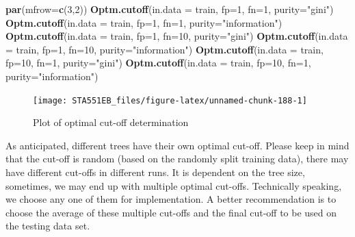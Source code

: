 \documentclass[
]{book}
\newenvironment{Shaded}{\begin{snugshade}}{\end{snugshade}}
\newcommand{\AttributeTok}[1]{\textcolor[rgb]{0.13,0.29,0.53}{#1}}
\newcommand{\DecValTok}[1]{\textcolor[rgb]{0.00,0.00,0.81}{#1}}
\newcommand{\FunctionTok}[1]{\textcolor[rgb]{0.13,0.29,0.53}{\textbf{#1}}}
\newcommand{\NormalTok}[1]{#1}
\newcommand{\StringTok}[1]{\textcolor[rgb]{0.31,0.60,0.02}{#1}}
\begin{document}
\begin{Shaded}
\begin{Highlighting}[]
\FunctionTok{par}\NormalTok{(}\AttributeTok{mfrow=}\FunctionTok{c}\NormalTok{(}\DecValTok{3}\NormalTok{,}\DecValTok{2}\NormalTok{))}
\FunctionTok{Optm.cutoff}\NormalTok{(}\AttributeTok{in.data =}\NormalTok{ train, }\AttributeTok{fp=}\DecValTok{1}\NormalTok{, }\AttributeTok{fn=}\DecValTok{1}\NormalTok{, }\AttributeTok{purity=}\StringTok{"gini"}\NormalTok{)}
\FunctionTok{Optm.cutoff}\NormalTok{(}\AttributeTok{in.data =}\NormalTok{ train, }\AttributeTok{fp=}\DecValTok{1}\NormalTok{, }\AttributeTok{fn=}\DecValTok{1}\NormalTok{, }\AttributeTok{purity=}\StringTok{"information"}\NormalTok{)}
\FunctionTok{Optm.cutoff}\NormalTok{(}\AttributeTok{in.data =}\NormalTok{ train, }\AttributeTok{fp=}\DecValTok{1}\NormalTok{, }\AttributeTok{fn=}\DecValTok{10}\NormalTok{, }\AttributeTok{purity=}\StringTok{"gini"}\NormalTok{)}
\FunctionTok{Optm.cutoff}\NormalTok{(}\AttributeTok{in.data =}\NormalTok{ train, }\AttributeTok{fp=}\DecValTok{1}\NormalTok{, }\AttributeTok{fn=}\DecValTok{10}\NormalTok{, }\AttributeTok{purity=}\StringTok{"information"}\NormalTok{)}
\FunctionTok{Optm.cutoff}\NormalTok{(}\AttributeTok{in.data =}\NormalTok{ train, }\AttributeTok{fp=}\DecValTok{10}\NormalTok{, }\AttributeTok{fn=}\DecValTok{1}\NormalTok{, }\AttributeTok{purity=}\StringTok{"gini"}\NormalTok{)}
\FunctionTok{Optm.cutoff}\NormalTok{(}\AttributeTok{in.data =}\NormalTok{ train, }\AttributeTok{fp=}\DecValTok{10}\NormalTok{, }\AttributeTok{fn=}\DecValTok{1}\NormalTok{, }\AttributeTok{purity=}\StringTok{"information"}\NormalTok{)}
\end{Highlighting}
\end{Shaded}

\begin{figure}

{\centering \texttt{[image: STA551EB\_files/figure-latex/unnamed-chunk-188-1]} 

}

\caption{Plot of optimal cut-off determination}\label{fig:unnamed-chunk-188}
\end{figure}

As anticipated, different trees have their own optimal cut-off. Please keep in mind that the cut-off is random (based on the randomly split training data), there may have different cut-offs in different runs. It is dependent on the tree size, sometimes, we may end up with multiple optimal cut-offs. Technically speaking, we choose any one of them for implementation. A better recommendation is to choose the average of these multiple cut-offs and the final cut-off to be used on the testing data set.
\end{document}
